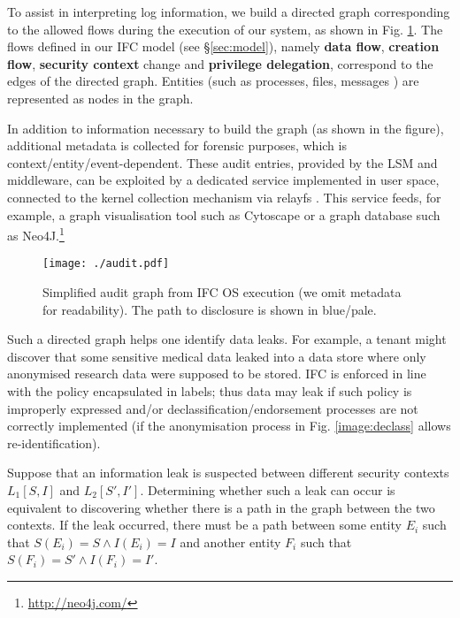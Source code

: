 \documentclass[10pt,journal,compsoc]{IEEEtran}
\begin{document}
To assist in interpreting log information, we build a directed graph corresponding to the allowed flows during the execution of our system, as shown in Fig. \ref{image:audit:graph}.
The flows defined in our IFC model (see \S\ref{sec:model}), namely \textbf{data flow}, \textbf{creation flow}, \textbf{security context} change and \textbf{privilege delegation}, correspond to the edges of the directed graph.
Entities (such as processes, files, messages \etc) are represented as nodes in the graph.

In addition to information necessary to build the graph (as shown in the figure), additional metadata is collected for forensic purposes, which is context/entity/event-dependent.
These audit entries, provided by the LSM and middleware, can be exploited by a dedicated service implemented in user space, connected to the kernel collection mechanism via \textsf{relayfs} \cite{zanussi2003relayfs}. 
This service feeds, for example, a graph visualisation tool such as Cytoscape \cite{smoot2011cytoscape} or a graph database such as Neo4J.\footnote{\url{http://neo4j.com/}}


\begin{figure}[t]
\centering
  \texttt{[image: ./audit.pdf]}
  \caption{Simplified audit graph from IFC OS execution (we omit metadata for readability). The path to disclosure is shown in blue\slash pale.} 
  \label{image:audit:graph}
\end{figure}


Such a directed graph helps one identify data  leaks. For example, a tenant might discover that some sensitive medical data leaked into a data store where only anonymised research data were supposed to be stored. 
IFC is enforced in line with the policy encapsulated in labels; thus data may leak if such policy is improperly expressed and\slash or declassification\slash endorsement processes are not correctly implemented (\eg if the anonymisation process in Fig. \ref{image:declass} allows re-identification).

Suppose that an information leak is suspected between different security contexts $L_1[S, I]$ and $L_2[S', I']$.  Determining whether such a leak can occur is equivalent to discovering whether there is a path in the graph between the two contexts.
If the leak occurred, there must be a path between some entity $E_i$ such that $S(E_i)=S \wedge I(E_i)=I$ and another entity $F_i$ such that $S(F_i)=S' \wedge I(F_i)=I'$. 
\end{document}

